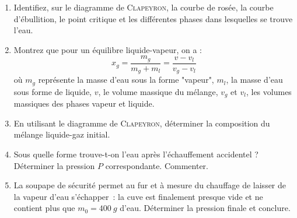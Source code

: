 \documentclass[a4paper, 10pt, final, garamond]{book}
\begin{document}
\begin{enumerate}
  \item Identifiez, sur le diagramme de \textsc{Clapeyron}, la courbe de rosée,
  la courbe d'ébullition, le point critique et les différentes phases dans
lesquelles se trouve l'eau.

  \item Montrez que pour un équilibre liquide-vapeur, on a :
	\[
		x_g = \frac{m_g}{m_g+m_l} = \frac{v-v_l}{v_g - v_l}
  \]
  où $m_g$ représente la masse d'eau sous la forme "vapeur", $m_l$, la masse
  d'eau sous forme de liquide, $v$, le volume massique du mélange, $v_g$ et
  $v_l$, les volumes massiques des phases vapeur et liquide.

  \item En utilisant le diagramme de \textsc{Clapeyron}, déterminer la
    composition du mélange liquide-gaz initial.

  \item Sous quelle forme trouve-t-on l'eau après l'échauffement accidentel ?
  Déterminer la pression $P$ correspondante. Commenter.

  \item La soupape de sécurité permet au fur et à mesure du chauffage de laisser
    de la vapeur d’eau s’échapper~: la cuve est finalement presque vide et ne
    contient plus que $m_0 = \SI{400}{g}$ d’eau. Déterminer la pression
    finale et conclure.
\end{enumerate}
\end{document}
